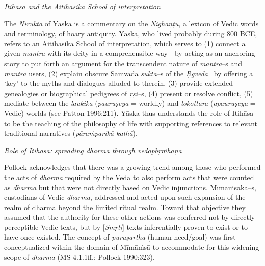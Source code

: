 \textit{Itihāsa and the Aitihāsika School of interpretation}

The \textit{Nirukta} of Yāska is a commentary on the \textit{Nighaṇṭu}, a lexicon of Vedic words and terminology, of hoary antiquity. Yāska, who lived probably during 800 BCE, refers to an Aitihāsika School of interpretation, which serves to (1) connect a given \textit{mantra} with its deity in a comprehensible way—by acting as an anchoring story to put forth an argument for the transcendent nature of \textit{mantra}–s and \textit{mantra} users, (2) explain obscure Samvāda \textit{sūkta}–s of the \textit{Ṛgveda}  by offering a ‘key’ to the myths and dialogues alluded to therein, (3) provide extended genealogies or biographical pedigrees of \textit{ṛṣi–}s, (4) present or resolve conflict, (5) mediate between the \textit{laukika} (\textit{pauruṣeya} = worldly) and \textit{lokottara} (\textit{apauruṣeya} = Vedic) worlds (see Patton 1996:211). Yāska thus understands the role of Itihāsa to be the teaching of the philosophy of life with supporting references to relevant traditional narratives (\textit{pāraṁparikā kathā}).

\textit{Role of Itihāsa: spreading dharma through vedopbṛṁhaṇa}

Pollock acknowledges that there was a growing trend among those who performed the acts of \textit{dharma} required by the Veda to also perform acts that were counted as \textit{dharma} but that were not directly based on Vedic injunctions. Mīmāṁsaka–s, custodians of Vedic \textit{dharma}, addressed and acted upon such expansion of the realm of dharma beyond the limited ritual realm. Toward that objective they assumed that the authority for these other actions was conferred not by directly perceptible Vedic texts, but by [\textit{Smṛti}] texts inferentially proven to exist or to have once existed. The concept of \textit{puruṣārtha} (human need/goal) was first conceptualized within the domain of Mīmāṁsā to accommodate for this widening scope of \textit{dharma} (MS 4.1.1ff.; Pollock 1990:323).

